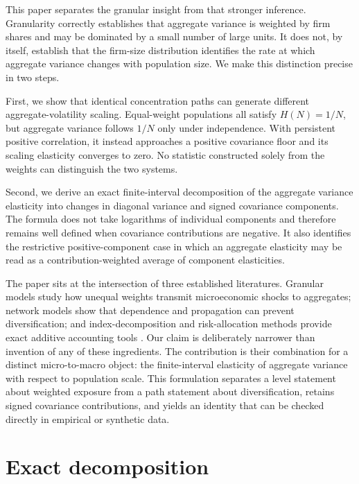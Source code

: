 \documentclass[preprint,12pt,authoryear]{elsarticle}
\begin{document}
This paper separates the granular insight from that stronger inference.
Granularity correctly establishes that aggregate variance is weighted
by firm shares and may be dominated by a small number of large units. It
does not, by itself, establish that the firm-size distribution identifies
the rate at which aggregate variance changes with population size. We
make this distinction precise in two steps.

First, we show that identical concentration paths can generate different
aggregate-volatility scaling. Equal-weight populations all satisfy
$H(N)=1/N$, but aggregate variance follows $1/N$ only under independence.
With persistent positive correlation, it instead approaches a positive
covariance floor and its scaling elasticity converges to zero. No
statistic constructed solely from the weights can distinguish the two
systems.

Second, we derive an exact finite-interval decomposition of the aggregate
variance elasticity into changes in diagonal variance and signed
covariance components. The formula does not take logarithms of individual
components and therefore remains well defined when covariance
contributions are negative. It also identifies the restrictive
positive-component case in which an aggregate elasticity may be read as
a contribution-weighted average of component elasticities.

The paper sits at the intersection of three established literatures.
Granular models study how unequal weights transmit microeconomic shocks
to aggregates; network models show that dependence and propagation can
prevent diversification; and index-decomposition and risk-allocation
methods provide exact additive accounting tools
\citep{gabaix2011,network_placeholder,lmdi_placeholder,risk_decomposition_placeholder}.
Our claim is deliberately narrower than invention of any of these
ingredients. The contribution is their combination for a distinct
micro-to-macro object: the finite-interval elasticity of aggregate
variance with respect to population scale. This formulation separates a
level statement about weighted exposure from a path statement about
diversification, retains signed covariance contributions, and yields an
identity that can be checked directly in empirical or synthetic data.

\section{Exact decomposition}
\label{sec:exact_decomposition}
\end{document}

